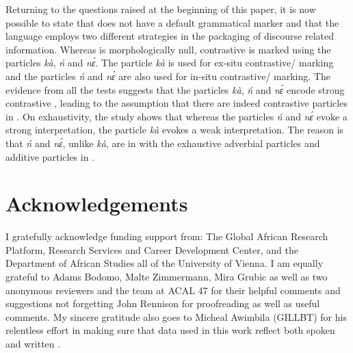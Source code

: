 \documentclass[output=paper,modfonts,nonflat,
 hidelinks
]{langsci/langscibook}
\begin{document}
Returning to the questions raised at the beginning of this paper, it is now possible to state that  does not have a default grammatical  marker and that the language employs two different strategies in the packaging of discourse related information. Whereas  is morphologically null, contrastive  is marked using the particles \textit{kà}, \textit{ń} and \textit{nɛ́}. The particle \textit{kà} is used for ex-situ contrastive{\slash} marking and the particles \textit{ń} and \textit{nɛ́} are also used for in-situ contrastive{\slash} marking. The evidence from all the tests suggests that the particles \textit{kà}, \textit{ń} and \textit{nɛ́} encode strong contrastive , leading to the assumption that there are indeed contrastive  particles in . On exhaustivity, the study shows that whereas the particles \textit{ń} and \textit{nɛ́} evoke a strong  interpretation, the particle \textit{kà} evokes a weak  interpretation.  The reason is that \textit{ń} and \textit{nɛ́}, unlike \textit{kà}, are in  with the exhaustive adverbial particles and additive particles in . 

\section*{Acknowledgements}
I gratefully acknowledge funding support from: The Global African Research Platform, Research Services and Career Development Center, and the Department of African Studies all of the University of Vienna. I am equally grateful to Adams Bodomo, Malte Zimmermann, Mira Grubic as well as two anonymous reviewers and the team at ACAL 47 for their helpful comments and suggestions not forgetting John Rennison for proofreading as well as useful comments. My sincere gratitude also goes to Micheal Awimbila (GILLBT) for his relentless effort in making sure that data used in this work reflect both spoken and written .                                      
\end{document}
